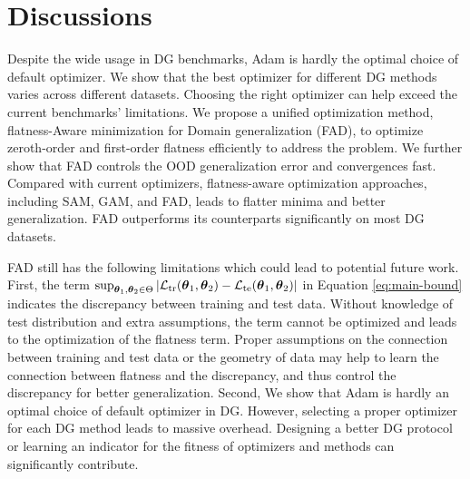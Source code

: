 \section{Discussions}
Despite the wide usage in DG benchmarks, Adam is hardly the optimal choice of default optimizer. We show that the best optimizer for different DG methods varies across different datasets. Choosing the right optimizer can help exceed the current benchmarks' limitations. We propose a unified optimization method, flatness-Aware minimization for Domain generalization (FAD), to optimize zeroth-order and first-order flatness efficiently to address the problem. We further show that FAD controls the OOD generalization error and convergences fast. Compared with current optimizers, flatness-aware optimization approaches, including SAM, GAM, and FAD, leads to flatter minima and better generalization. FAD outperforms its counterparts significantly on most DG datasets. 

FAD still has the following limitations which could lead to potential future work. First, the term $\sup_{\boldsymbol{\theta}_1, \boldsymbol{\theta}_2 \in \Theta}\left|\mathcal{L}_{{\text{tr}}}(\boldsymbol{\theta}_1, \boldsymbol{\theta}_2) - \mathcal{L}_{{\text{te}}}(\boldsymbol{\theta}_1, \boldsymbol{\theta}_2)\right|$ in Equation \eqref{eq:main-bound} indicates the discrepancy between training and test data. Without knowledge of test distribution and extra assumptions, the term cannot be optimized and leads to the optimization of the flatness term. Proper assumptions on the connection between training and test data or the geometry of data may help to learn the connection between flatness and the discrepancy, and thus control the discrepancy for better generalization. Second, We show that Adam is hardly an optimal choice of default optimizer in DG. However, selecting a proper optimizer for each DG method leads to massive overhead. Designing a better DG protocol or learning an indicator for the fitness of optimizers and methods can significantly contribute.  